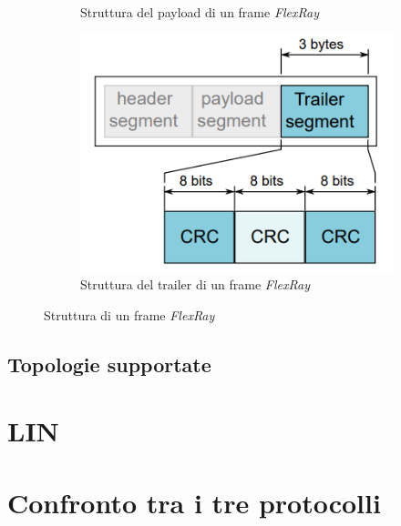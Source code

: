 \begin{figure}[h]
\begin{subfigure}{0.4\textwidth}
        \caption{Struttura del payload di un frame \emph{FlexRay}}
        \label{fig:flexray-payload}
    \end{subfigure}
    \centering
    \begin{subfigure}{0.4\textwidth}
        \vspace{0.3cm}
        \includegraphics[width=1\textwidth]{capitoli/figure-protocolli/flexray-trailer.png}
        \caption{Struttura del trailer di un frame \emph{FlexRay}}
        \label{fig:flexray-trailer}
    \end{subfigure}
    \caption{Struttura di un frame \emph{FlexRay}}
    \label{fig:flexray-frame-structure}
\end{figure}

\subsection{Topologie supportate}

\section{LIN}

\section{Confronto tra i tre protocolli}

\newpage
